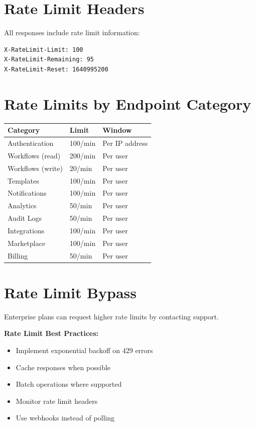 \documentclass[11pt,a4paper]{report}
\begin{document}
\section{Rate Limit Headers}

All responses include rate limit information:

\begin{lstlisting}[style=jsoncode]
X-RateLimit-Limit: 100
X-RateLimit-Remaining: 95
X-RateLimit-Reset: 1640995200
\end{lstlisting}

\section{Rate Limits by Endpoint Category}

\begin{longtable}{|l|l|l|}
\hline
\textbf{Category} & \textbf{Limit} & \textbf{Window} \\ \hline
\endhead

Authentication & 100/min & Per IP address \\ \hline
Workflows (read) & 200/min & Per user \\ \hline
Workflows (write) & 20/min & Per user \\ \hline
Templates & 100/min & Per user \\ \hline
Notifications & 100/min & Per user \\ \hline
Analytics & 50/min & Per user \\ \hline
Audit Logs & 50/min & Per user \\ \hline
Integrations & 100/min & Per user \\ \hline
Marketplace & 100/min & Per user \\ \hline
Billing & 50/min & Per user \\ \hline

\end{longtable}

\section{Rate Limit Bypass}

Enterprise plans can request higher rate limits by contacting support.

\begin{infobox}
\textbf{Rate Limit Best Practices:}
\begin{itemize}[leftmargin=*]
    \item Implement exponential backoff on 429 errors
    \item Cache responses when possible
    \item Batch operations where supported
    \item Monitor rate limit headers
    \item Use webhooks instead of polling
\end{itemize}
\end{infobox}
\end{document}
